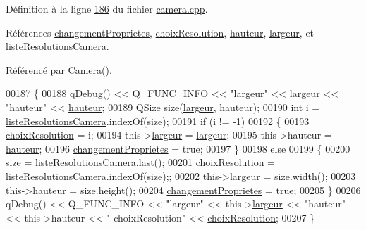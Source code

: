 Définition à la ligne \hyperlink{camera_8cpp_source_l00186}{186} du fichier \hyperlink{camera_8cpp_source}{camera.\+cpp}.



Références \hyperlink{camera_8h_source_l00070}{changement\+Proprietes}, \hyperlink{camera_8h_source_l00072}{choix\+Resolution}, \hyperlink{camera_8h_source_l00066}{hauteur}, \hyperlink{camera_8h_source_l00065}{largeur}, et \hyperlink{camera_8h_source_l00071}{liste\+Resolutions\+Camera}.



Référencé par \hyperlink{camera_8cpp_source_l00012}{Camera()}.


\begin{DoxyCode}
00187 \{    
00188     qDebug() << Q\_FUNC\_INFO << \textcolor{stringliteral}{"largeur"} << \hyperlink{class_camera_ad64f26cdfc5aa561208b273d430938cf}{largeur} << \textcolor{stringliteral}{"hauteur"} << 
      \hyperlink{class_camera_a5d89d7f9d1a5eab4175dd168c7fbf1c7}{hauteur};
00189     QSize size(\hyperlink{class_camera_ad64f26cdfc5aa561208b273d430938cf}{largeur}, hauteur);
00190     \textcolor{keywordtype}{int} i = \hyperlink{class_camera_a96af62eaf7828664865b56e7c69e771c}{listeResolutionsCamera}.indexOf(size);
00191     \textcolor{keywordflow}{if} (i != -1)
00192     \{
00193         \hyperlink{class_camera_a3fdddf6f548f04d7bdc26f32602a03d4}{choixResolution} = i;
00194         this->\hyperlink{class_camera_ad64f26cdfc5aa561208b273d430938cf}{largeur} = \hyperlink{class_camera_ad64f26cdfc5aa561208b273d430938cf}{largeur};
00195         this->hauteur = \hyperlink{class_camera_a5d89d7f9d1a5eab4175dd168c7fbf1c7}{hauteur};
00196         \hyperlink{class_camera_a50d2b3ef5c08f8b61bbe2115d71005bd}{changementProprietes} = \textcolor{keyword}{true};
00197     \}
00198     \textcolor{keywordflow}{else}
00199     \{
00200         size = \hyperlink{class_camera_a96af62eaf7828664865b56e7c69e771c}{listeResolutionsCamera}.last();
00201         \hyperlink{class_camera_a3fdddf6f548f04d7bdc26f32602a03d4}{choixResolution} = \hyperlink{class_camera_a96af62eaf7828664865b56e7c69e771c}{listeResolutionsCamera}.indexOf(size);;
00202         this->\hyperlink{class_camera_ad64f26cdfc5aa561208b273d430938cf}{largeur} = size.width();
00203         this->hauteur = size.height();
00204         \hyperlink{class_camera_a50d2b3ef5c08f8b61bbe2115d71005bd}{changementProprietes} = \textcolor{keyword}{true};
00205     \}
00206     qDebug() << Q\_FUNC\_INFO << \textcolor{stringliteral}{"largeur"} << this->\hyperlink{class_camera_ad64f26cdfc5aa561208b273d430938cf}{largeur} << \textcolor{stringliteral}{"hauteur"} << this->hauteur << \textcolor{stringliteral}{"
      choixResolution"} << \hyperlink{class_camera_a3fdddf6f548f04d7bdc26f32602a03d4}{choixResolution};
00207 \}
\end{DoxyCode}
\mbox{\label{class_camera_a79630483bf9912a8fd1afe412ee8c848}} 
